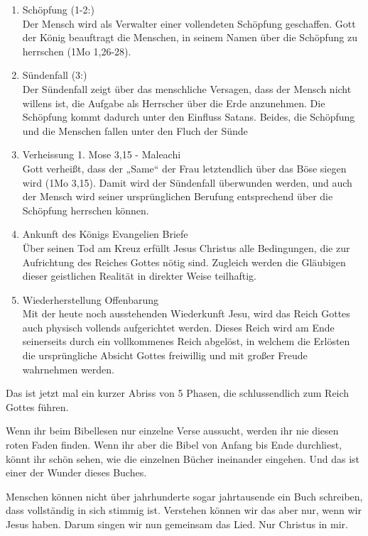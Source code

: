 \documentclass{../../inc/mybib}
\begin{document}
\begin{spacing}{1.5}
   \begin{enumerate}
    \item Schöpfung (1-2:)\\
     Der Mensch wird als Verwalter einer vollendeten Schöpfung geschaffen. Gott der König 
beauftragt die Menschen, in seinem Namen über die Schöpfung zu herrschen (1Mo 
1,26-28). 
    \item Sündenfall (3:)\\
    Der Sündenfall zeigt über das menschliche Versagen, dass der Mensch nicht willens ist, 
die Aufgabe als Herrscher über die Erde anzunehmen. Die Schöpfung kommt dadurch 
unter den Einfluss Satans. Beides, die Schöpfung und die Menschen fallen unter den 
Fluch der Sünde
    \item Verheissung 1. Mose 3,15 - Maleachi\\
    Gott verheißt, dass der „Same“ der Frau letztendlich über das Böse siegen wird (1Mo 
3,15). Damit wird der Sündenfall überwunden werden, und auch der Mensch wird 
seiner ursprünglichen Berufung entsprechend über die Schöpfung herrschen können.
    \item Ankunft des Königs Evangelien Briefe\\
     Über seinen Tod am Kreuz erfüllt Jesus Christus alle Bedingungen, die zur Aufrichtung 
des Reiches Gottes nötig sind. Zugleich werden die Gläubigen dieser geistlichen 
Realität in direkter Weise teilhaftig. 
    \item Wiederherstellung Offenbarung\\
     Mit der heute noch ausstehenden Wiederkunft Jesu, wird das Reich Gottes auch 
physisch vollends aufgerichtet werden. Dieses Reich wird am Ende seinerseits durch ein 
 vollkommenes Reich abgelöst, in welchem die Erlösten die ursprüngliche Absicht 
Gottes freiwillig und mit großer Freude wahrnehmen werden.
   \end{enumerate}
Das ist jetzt mal ein kurzer Abriss von 5 Phasen, die schlussendlich zum Reich Gottes führen.

Wenn ihr beim Bibellesen nur einzelne Verse aussucht, werden ihr nie diesen roten Faden finden. Wenn ihr aber die Bibel von Anfang bis Ende durchliest, könnt ihr schön sehen, wie die einzelnen Bücher ineinander eingehen. Und das ist einer der Wunder dieses Buches.

Menschen können nicht über jahrhunderte sogar jahrtausende ein Buch schreiben, dass vollständig in sich stimmig ist. Verstehen können wir das aber nur, wenn wir Jesus haben. Darum singen wir nun gemeinsam das Lied. Nur Christus in mir.

\end{spacing}
\end{document}
